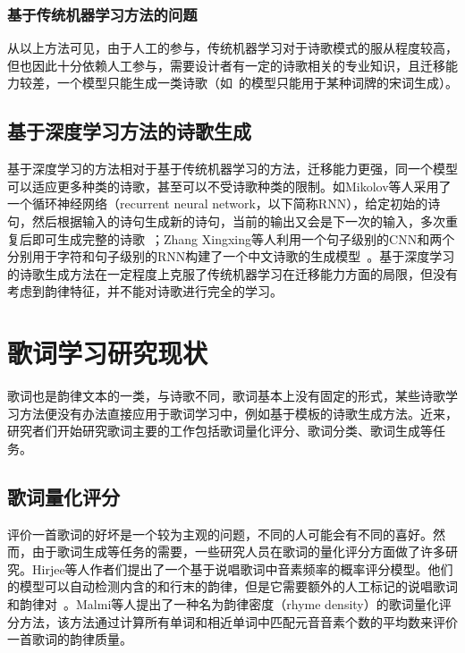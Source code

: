 \subsubsection{基于传统机器学习方法的问题}
从以上方法可见，由于人工的参与，传统机器学习对于诗歌模式的服从程度较高，但也因此十分依赖人工参与，需要设计者有一定的诗歌相关的专业知识，且迁移能力较差，一个模型只能生成一类诗歌（如~\autocite{jiang2015jiyu}的模型只能用于某种词牌的宋词生成）。\par

\subsection{基于深度学习方法的诗歌生成}
基于深度学习的方法相对于基于传统机器学习的方法，迁移能力更强，同一个模型可以适应更多种类的诗歌，甚至可以不受诗歌种类的限制。如Mikolov等人采用了一个循环神经网络（recurrent neural network，以下简称RNN），给定初始的诗句，然后根据输入的诗句生成新的诗句，当前的输出又会是下一次的输入，多次重复后即可生成完整的诗歌~\autocite{mikolov2010recurrent}；Zhang Xingxing等人利用一个句子级别的CNN和两个分别用于字符和句子级别的RNN构建了一个中文诗歌的生成模型~\autocite{zhang2014chinese}。基于深度学习的诗歌生成方法在一定程度上克服了传统机器学习在迁移能力方面的局限，但没有考虑到韵律特征，并不能对诗歌进行完全的学习。\par

\section{歌词学习研究现状}
歌词也是韵律文本的一类，与诗歌不同，歌词基本上没有固定的形式，某些诗歌学习方法便没有办法直接应用于歌词学习中，例如基于模板的诗歌生成方法。近来，研究者们开始研究歌词主要的工作包括歌词量化评分、歌词分类、歌词生成等任务。\par

\subsection{歌词量化评分}
评价一首歌词的好坏是一个较为主观的问题，不同的人可能会有不同的喜好。然而，由于歌词生成等任务的需要，一些研究人员在歌词的量化评分方面做了许多研究。Hirjee等人作者们提出了一个基于说唱歌词中音素频率的概率评分模型。他们的模型可以自动检测内含的和行末的韵律，但是它需要额外的人工标记的说唱歌词和韵律对~\autocite{hirjee2009automatic}。Malmi等人提出了一种名为韵律密度（rhyme density）的歌词量化评分方法，该方法通过计算所有单词和相近单词中匹配元音音素个数的平均数来评价一首歌词的韵律质量。\par

